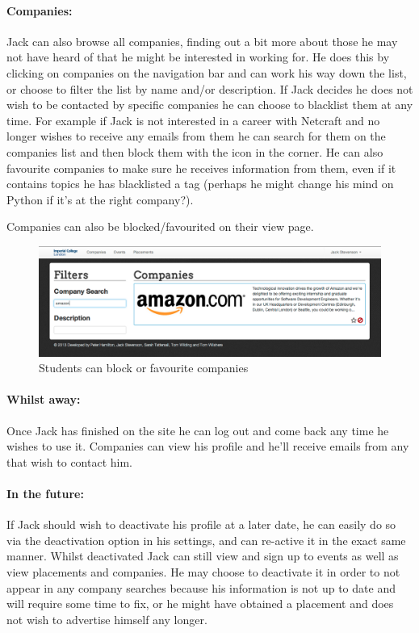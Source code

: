 
  \paragraph{Companies:}
    Jack can also browse all companies, finding out a bit more about those he may not have heard of that he might be interested in working for. He does this by clicking on companies on the navigation bar and can work his way down the list, or choose to filter the list by name and/or description.
    If Jack decides he does not wish to be contacted by specific companies he can choose to blacklist them at any time. For example if Jack is not interested in a career with Netcraft and no longer wishes to receive any emails from them he can search for them on the companies list and then block them with the icon in the corner. He can also favourite companies to make sure he receives information from them, even if it contains topics he has blacklisted a tag (perhaps he might change his mind on Python if it's at the right company?).

    Companies can also be blocked/favourited on their view page.

    \begin{figure}[H]\centering
    \includegraphics[scale=0.3]{images/user_experiences/student/block_amazon}
    \caption{Students can block or favourite companies}
    \end{figure}

  \paragraph{Whilst away:}
    Once Jack has finished on the site he can log out and come back any time he wishes to use it. Companies can view his profile and he'll receive emails from any that wish to contact him.

  \paragraph{In the future:}
    If Jack should wish to deactivate his profile at a later date, he can easily do so via the deactivation option in his settings, and can re-active it in the exact same manner. Whilst deactivated Jack can still view and sign up to events as well as view placements and companies. He may choose to deactivate it in order to not appear in any company searches because his information is not up to date and will require some time to fix, or he might have obtained a placement and does not wish to advertise himself any longer.

